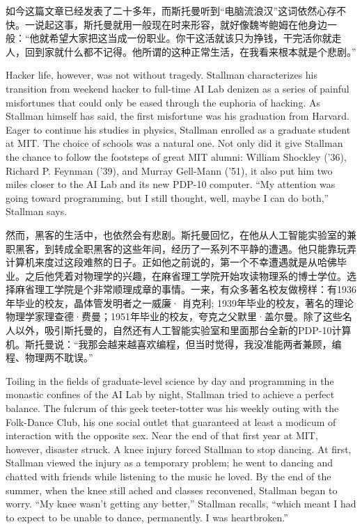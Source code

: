 \ifdefined\chs
如今这篇文章已经发表了二十多年，而斯托曼听到``电脑流浪汉''这词依然心存不快。一说起这事，斯托曼就用一般现在时来形容，就好像魏岑鲍姆在他身边一般：``他就希望大家把这当成一份职业。你干这活就该只为挣钱，干完活你就走人，回到家就什么都不记得。他所谓的这种正常生活，在我看来根本就是个悲剧。''
\fi

\ifdefined\eng
Hacker life, however, was not without tragedy. Stallman characterizes his transition from weekend hacker to full-time AI Lab denizen as a series of painful misfortunes that could only be eased through the euphoria of hacking. As Stallman himself has said, the first misfortune was his graduation from Harvard. Eager to continue his studies in physics, Stallman enrolled as a graduate student at MIT. The choice of schools was a natural one. Not only did it give Stallman the chance to follow the footsteps of great MIT alumni: William Shockley ('36), Richard P. Feynman ('39), and Murray Gell-Mann ('51), it also put him two miles closer to the AI Lab and its new PDP-10 computer. ``My attention was going toward programming, but I still thought, well, maybe I can do both,'' Stallman says.
\fi

\ifdefined\chs
然而，黑客的生活中，也依然会有悲剧。斯托曼回忆，在他从人工智能实验室的兼职黑客，到转成全职黑客的这些年间，经历了一系列不平静的遭遇。他只能靠玩弄计算机来度过这段难熬的日子。正如他之前说的，第一个不幸遭遇就是从哈佛毕业。之后他凭着对物理学的兴趣，在麻省理工学院开始攻读物理系的博士学位。选择麻省理工学院是个非常顺理成章的事情。一来，有众多著名校友做榜样：有1936年毕业的校友，晶体管发明者之一威廉· 肖克利; 1939年毕业的校友，著名的理论物理学家理查德·费曼；1951年毕业的校友，夸克之父默里·盖尔曼。除了这些名人以外，吸引斯托曼的，自然还有人工智能实验室和里面那台全新的PDP-10计算机。斯托曼说：``我那会越来越喜欢编程，但当时觉得，我没准能两者兼顾，编程、物理两不耽误。''
\fi

\ifdefined\eng
Toiling in the fields of graduate-level science by day and programming in the monastic confines of the AI Lab by night, Stallman tried to achieve a perfect balance. The fulcrum of this geek teeter-totter was his weekly outing with the Folk-Dance Club, his one social outlet that guaranteed at least a modicum of interaction with the opposite sex. Near the end of that first year at MIT, however, disaster struck. A knee injury forced Stallman to stop dancing. At first, Stallman viewed the injury as a temporary problem; he went to dancing and chatted with friends while listening to the music he loved. By the end of the summer, when the knee still ached and classes reconvened, Stallman began to worry. ``My knee wasn't getting any better,'' Stallman recalls, ``which meant I had to expect to be unable to dance, permanently. I was heartbroken.''
\fi

